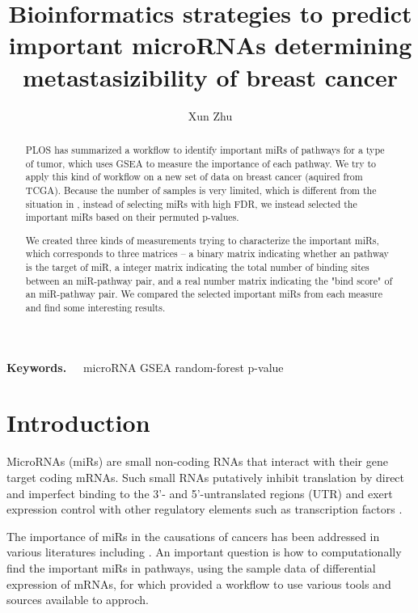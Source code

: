 \documentclass{scrartcl}
\title{Bioinformatics strategies to predict important microRNAs determining
metastasizibility of breast cancer}
\author{Xun Zhu}
\date{}
\numberwithin{figure}{section}
\numberwithin{table}{section}
\begin{document}
\maketitle
\begin{abstract}

  PLOS has summarized a workflow\cite{plos} to identify important miRs of
  pathways for a type of tumor, which uses GSEA\cite{subramanian2005gene} to
  measure the importance of each pathway. We try to apply this kind of workflow
  on a new set of data on breast cancer (aquired from TCGA). Because the number of
  samples is very limited, which is different from the situation in \cite{plos},
  instead of selecting miRs with high FDR, we instead selected the important miRs
  based on their permuted p-values.

  We created three kinds of measurements trying to characterize the
  important miRs, which corresponds to three matrices -- a binary matrix
  indicating whether an pathway is the target of miR, a integer matrix
  indicating the total number of binding sites between an miR-pathway pair, and
  a real number matrix indicating the "bind score" of an miR-pathway pair.
  We compared the selected important miRs from each measure and find some interesting
  results.

\end{abstract}

\bigskip
\textbf{Keywords.~~ } microRNA GSEA random-forest p-value

\clearpage
\tableofcontents
\clearpage

\section{Introduction}

MicroRNAs (miRs) are small non-coding RNAs that interact with their gene target
coding mRNAs. Such small RNAs putatively inhibit translation by direct and
imperfect binding to the 3'- and 5'-untranslated regions
(UTR)\cite{bartel2004micrornas} and exert expression control with other
regulatory elements such as transcription factors \cite{martinez2009interplay,
shalgi2007global, wang2010transmir}.

The importance of miRs in the causations of cancers has been addressed in
various literatures including \cite{houbaviy2003embryonic, croce2009causes,
volinia2006microrna, lu2005microrna, esquela2006oncomirs, chen2005micrornas,
hurst2009metastamir, chan2011cancer}. An important question is how to
computationally find the important miRs in pathways, using the sample data of
differential expression of mRNAs, for which \cite{plos} provided a workflow
to use various tools and sources available to approch.
\end{document}
